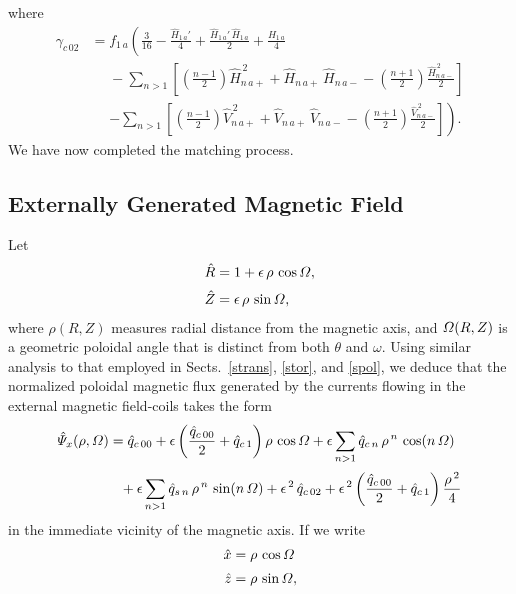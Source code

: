 \documentclass[12pt,prb,aps]{revtex4-1}
\begin{document}
where
\begin{align}
\gamma_{c\,02} &= f_{1\,a}\left(\frac{3}{16} -\frac{\hat{H}_{1\,a}'}{4}+\frac{\hat{H}_{1\,a}'\,\hat{H}_{1\,a}}{2}+\frac{\hat{H}_{1\,a}}{4}\right.\nonumber\\[0.5ex]
&\phantom{=}-\sum_{n>1}\left[\left(\frac{n-1}{2}\right)\hat{H}_{n\,a+}^{\,2} +\hat{H}_{n\,a+}\,\hat{H}_{n\,a-}-\left(\frac{n+1}{2}\right)\frac{\hat{H}_{n\,a-}^{\,2}}{2}\right]
\nonumber\\[0.5ex]
&\phantom{=}\left.-\sum_{n>1}\left[\left(\frac{n-1}{2}\right)\hat{V}_{n\,a+}^{\,2} + \hat{V}_{n\,a+}\,\hat{V}_{n\,a-}-\left(\frac{n+1}{2}\right)\frac{\hat{V}_{n\,a-}^{\,2}}{2}\right]
\right).\label{e117e}
\end{align}
We have now completed the matching process. 

\subsection{Externally Generated Magnetic Field}\label{eext}
Let
\begin{align}\label{e116f}
\hat{R} &= 1+\epsilon\,\rho\,\cos{\mit\Omega},\\[0.5ex]
\hat{Z} &= \epsilon\,\rho\,\sin{\mit\Omega},\label{e117f}
\end{align}
where $\rho(R,Z)$ measures radial distance from the magnetic axis, and ${\mit\Omega}(R,Z)$ is a geometric poloidal angle that is distinct from both $\theta$ and $\omega$. Using similar analysis to that
employed in Sects.~\ref{strans}, \ref{stor}, and \ref{spol}, we deduce that the normalized poloidal magnetic flux generated by
the currents flowing in the external magnetic field-coils takes the form 
\begin{align}
\hat{\mit\Psi}_x(\rho,{\mit\Omega}) &= \hat{q}_{c\,00}
+\epsilon\left(\frac{\hat{q}_{c\,00}}{2}+\hat{q}_{c\,1}\right)\rho\,\cos{\mit\Omega}+\epsilon\sum_{n>1}\hat{q}_{c\,n}\,\rho^{\,n}\,\cos(n\,{\mit\Omega})\nonumber\\[0.5ex]
&\phantom{=}
+\epsilon\sum_{n>1} \hat{q}_{s\,n}\,\rho^{\,n}\,\sin(n\,{\mit\Omega})+\epsilon^{\,2}\,\hat{q}_{c\,02} + \epsilon^{\,2}\left(\frac{\hat{q}_{c\,00}}{2}+\hat{q}_{c\,1}\right)\frac{\rho^{\,2}}{4}
\end{align}
in the immediate vicinity of the magnetic axis. If we write
\begin{align}\label{e119f}
\hat{x}&= \rho\,\cos{\mit\Omega}\\[0.5ex]
 \hat{z}&=\rho\,\sin{\mit\Omega},\label{e120f}
 \end{align} 
\end{document}
